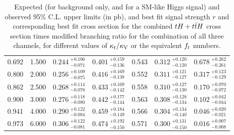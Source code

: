 \begin{table}[h!]
\begin{tabular}{rr|ccc|cc}
    0.692 &  1.500 & $0.244~_{-0.071}^{+0.106}$ & $0.401~_{-0.136}^{+0.159}$ & 0.543 & $0.312~_{-0.120}^{+0.120}$ & $0.678~_{-0.261}^{+0.262}$ \\
    0.800 &  2.000 & $0.256~_{-0.075}^{+0.109}$ & $0.416~_{-0.138}^{+0.169}$ & 0.552 & $0.311~_{-0.127}^{+0.121}$ & $0.317~_{-0.129}^{+0.123}$ \\
    0.862 &  2.500 & $0.268~_{-0.078}^{+0.114}$ & $0.433~_{-0.142}^{+0.169}$ & 0.558 & $0.310~_{-0.130}^{+0.127}$ & $0.170~_{-0.072}^{+0.070}$ \\
    0.900 &  3.000 & $0.276~_{-0.080}^{+0.118}$ & $0.442~_{-0.144}^{+0.177}$ & 0.563 & $0.308~_{-0.134}^{+0.128}$ & $0.102~_{-0.044}^{+0.042}$ \\
    0.941 &  4.000 & $0.290~_{-0.084}^{+0.122}$ & $0.459~_{-0.149}^{+0.184}$ & 0.566 & $0.304~_{-0.140}^{+0.134}$ & $0.046~_{-0.021}^{+0.020}$ \\
    0.973 &  6.000 & $0.306~_{-0.081}^{+0.122}$ & $0.474~_{-0.150}^{+0.192}$ & 0.571 & $0.300~_{-0.150}^{+0.131}$ & $0.016~_{-0.008}^{+0.007}$ \\
    \hline
  \end{tabular}
  \caption{Expected (for background only, and for a SM-like Higgs signal) and observed 95\% C.L. upper limits (in pb), and best fit signal strength $r$ and corresponding best fit cross section for the combined $tH+t\bar{t}H$ cross section times modified branching ratio for the combination of all three channels, for different values of $\kappa_t/\kappa_\text{V}$ or the equivalent $f_t$ numbers.}
  \label{tab:xslimits}
\end{table}



